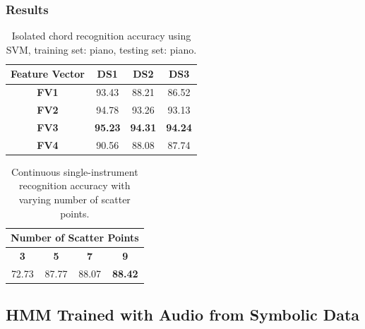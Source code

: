 \documentclass{beamer}
\begin{document}
\begin{frame}
	\frametitle{Results}
	
\begin{table}\small
\centering
\begin{tabular}{|c|c|c|c|} \hline
\textbf{Feature Vector} & \textbf{DS1} & \textbf{DS2} & \textbf{DS3} \\ \hline
\textbf{FV1} & 93.43 & 88.21 & 86.52 \\ \hline
\textbf{FV2} & 94.78 & 93.26 & 93.13 \\ \hline
\textbf{FV3} & \textbf{95.23} & \textbf{94.31} & \textbf{94.24} \\ \hline
\textbf{FV4} & 90.56 & 88.08 & 87.74 \\ \hline
\end{tabular}
\caption{Isolated chord recognition accuracy using SVM, training set: piano, testing set: piano.}
\label{tab:tab7}
\end{table}

\begin{table}\small
\centering
\begin{tabular}{|c|c|c|c|} \hline
\multicolumn{4}{|c|}{\textbf{Number of Scatter Points}} \\ \hline
\textbf{3} & \textbf{5} & \textbf{7} & \textbf{9} \\ \hline
72.73 & 87.77 & 88.07 & \textbf{88.42} \\ \hline
\end{tabular}
\caption{Continuous single-instrument recognition accuracy with varying number of scatter points.}
\label{tab:tab8}
\end{table}

\end{frame}


\subsection[HMM Trained with Audio from Symbolic Data]{HMM Trained with Audio from Symbolic Data}
\end{document}
